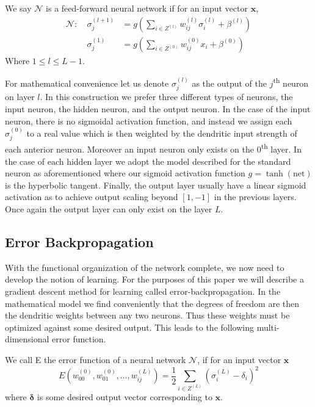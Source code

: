     \begin{definition}
    
    We say $\mathcal{N}$ is a feed-forward neural network if for an input vector $\pmb{x}$,
	\[
    	\begin{aligned}
        \mathcal{N}:\ & \sigma_j^{(l+1)} &= g\left(\sum_{i \in Z^{(l)}}w_{ij}^{(l)}\sigma_i^{(l)} + \beta^{(l)}\right) \\ & \sigma_j^{(1)} &= g\left(\sum_{i \in Z^{(0)}}w_{ij}^{(0)}x_i + \beta^{(0)} \right)
        \end{aligned}
    \]
    Where $1\leq l \leq L-1$. 
    \end{definition}
    
    For mathematical convenience let us denote \( \sigma_j^{(l)}\) as the output of the \(j\)\textsuperscript{th} neuron on layer \(l\). In this construction we prefer three different types of neurons, the input neuron, the hidden neuron, and the output neuron. In the case of the input neuron, there is no sigmoidal activation function, and instead we assign each \( \sigma_j^{(0)}\) to a real value which is then weighted by the dendritic input strength of each anterior neuron. Moreover an input neuron only exists on the \(0\)\textsuperscript{th} layer. In the case of each hidden layer we adopt the model described for the standard neuron as aforementioned where our sigmoid activation function \(g = \tanh(\mathrm{net})\)  is the hyperbolic tangent.%
Finally, the output layer usually have a linear sigmoid activation as to achieve output scaling beyond \([1,-1]\) in the previous layers. Once again the output layer can only exist on the layer \(L\).  

\subsection{Error Backpropagation}
   With the  functional organization of the network complete, we now need to develop the notion of learning. For the purposes of this paper we will describe a gradient descent method for learning called error-backpropagation. In the mathematical model we find conveniently that the degrees of freedom are then the dendritic weights between any two neurons. Thus these weights must be optimized against some desired output. This leads to the following multi-dimensional error function.
   \begin{definition} We call E the error function of a neural network $\mathcal{N}$, if for an input vector \(\pmb{x}\)
\[ E\left(w_{00}^{(0)}, w_{01}^{(0)}, \dots ,w_{ij}^{(L)}\right) = \frac12\sum_{i \in Z^{(L)}}{\left(\sigma_i^{(L)}-\delta_i\right)^2}\]where \(\pmb{\delta}\) is some desired output vector corresponding to \(\pmb{x}\). 
\end{definition}

